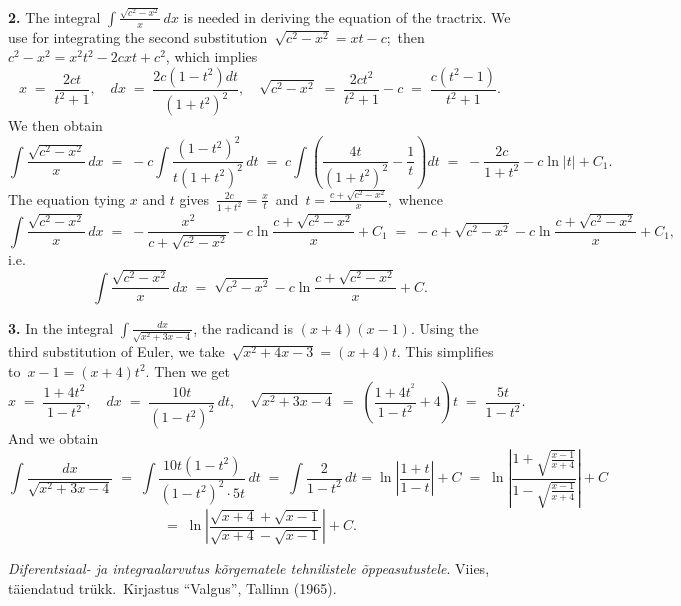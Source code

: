 \documentclass[12pt]{article}
\begin{document}
\textbf{2.}  The integral $\displaystyle\int\!\frac{\sqrt{c^2-x^2}}{x}\,dx$ is needed in deriving the equation of the tractrix.  We use for integrating the second substitution\, 
$\sqrt{c^2-x^2} = xt-c$;\, then\, $c^2-x^2 = x^2t^2-2cxt+c^2$, which implies
$$x \;=\; \frac{2ct}{t^2+1},\quad dx \;=\; \frac{2c(1-t^2)dt}{(1+t^2)^2},\quad 
\sqrt{c^2-x^2} \;=\; \frac{2ct^2}{t^2+1}-c \;=\; \frac{c(t^2-1)}{t^2+1}.$$ 
We then obtain
$$\int\!\frac{\sqrt{c^2-x^2}}{x}\,dx \;=\; -c\int\!\frac{(1-t^2)^2}{t(1+t^2)^2}\,dt \;=\; 
c\int\!\left(\frac{4t}{(1+t^2)^2}-\frac{1}{t}\right)dt \;=\; -\frac{2c}{1+t^2}-c\ln|t|+C_1.$$
The equation tying $x$ and $t$ gives\, $\frac{2c}{1+t^2} = \frac{x}{t}$\, and\, $t = \frac{c+\sqrt{c^2-x^2}}{x}$,\, whence
$$\int\!\frac{\sqrt{c^2-x^2}}{x}\,dx \;=\; -\frac{x^2}{c+\sqrt{c^2-x^2}}-c\ln\frac{c+\sqrt{c^2-x^2}}{x}+C_1 \;=\; 
-c+\sqrt{c^2-x^2}-c\ln\frac{c+\sqrt{c^2-x^2}}{x}+C_1,$$
i.e. 
$$\int\!\frac{\sqrt{c^2-x^2}}{x}\,dx \;=\; \sqrt{c^2-x^2}-c\ln\frac{c+\sqrt{c^2-x^2}}{x}+C.$$

\textbf{3.}  In the integral $\displaystyle\int\!\frac{dx}{\sqrt{x^2+3x-4}}$, the radicand is $(x+4)(x-1)$.  Using the third substitution of Euler, we take\, $\sqrt{x^2+4x-3} = (x+4)t$.  This simplifies to\, $x-1 = (x+4)t^2$.  Then we get
$$x \;=\; \frac{1+4t^2}{1-t^2},\quad dx \;=\; \frac{10t}{(1-t^2)^2}\,dt,\quad 
\sqrt{x^2+3x-4} \;=\; \left(\frac{1+4t^^2}{1-t^2}+4\right)t \;=\; \frac{5t}{1-t^2}.$$
And we obtain
$$\int\!\frac{dx}{\sqrt{x^2+3x-4}} \;=\; \int\!\frac{10t(1-t^2)}{(1-t^2)^2\cdot5t}\,dt \;=\; \int\!\frac{2}{1-t^2}\,dt
= \ln\left|\frac{1+t}{1-t}\right|+C \;=\;
 \ln\left|\frac{1+\sqrt{\frac{x-1}{x+4}}}{1-\sqrt{\frac{x-1}{x+4}}}\right|+C$$
$$=\; \ln\left|\frac{\sqrt{x+4}+\sqrt{x-1}}{\sqrt{x+4}-\sqrt{x-1}}\right|+C.$$



\begin{thebibliography}{9}
 {\em Diferentsiaal- ja integraalarvutus k\~{o}rgematele tehnilistele \~{o}ppeasutustele}.  Viies, t\"aiendatud tr\"ukk.\, Kirjastus ``Valgus'', Tallinn  (1965).
\end{thebibliography}
\end{document}
